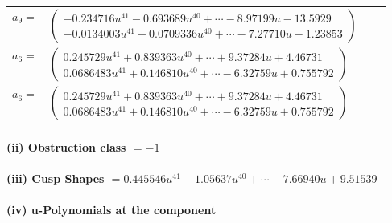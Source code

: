 \documentclass[1p]{elsarticle_modified}
\theoremstyle{definition}
\begin{document}
\begin{tabular}{m{7pt} m{180pt} m{7pt} m{180pt} }
\flushright $a_{9}=$&$\begin{pmatrix}-0.234716 u^{41}-0.693689 u^{40}+\cdots-8.97199 u-13.5929\\-0.0134003 u^{41}-0.0709336 u^{40}+\cdots-7.27710 u-1.23853\end{pmatrix}$ \\
\flushright $a_{6}=$&$\begin{pmatrix}0.245729 u^{41}+0.839363 u^{40}+\cdots+9.37284 u+4.46731\\0.0686483 u^{41}+0.146810 u^{40}+\cdots-6.32759 u+0.755792\end{pmatrix}$\\ \flushright $a_{6}=$&$\begin{pmatrix}0.245729 u^{41}+0.839363 u^{40}+\cdots+9.37284 u+4.46731\\0.0686483 u^{41}+0.146810 u^{40}+\cdots-6.32759 u+0.755792\end{pmatrix}$\\&\end{tabular}
\flushleft \textbf{(ii) Obstruction class $= -1$}\\~\\
\flushleft \textbf{(iii) Cusp Shapes $= 0.445546 u^{41}+1.05637 u^{40}+\cdots-7.66940 u+9.51539$}\\~\\
\newpage\renewcommand{\arraystretch}{1}
\flushleft \textbf{(iv) u-Polynomials at the component}\newline \\
\end{document}
